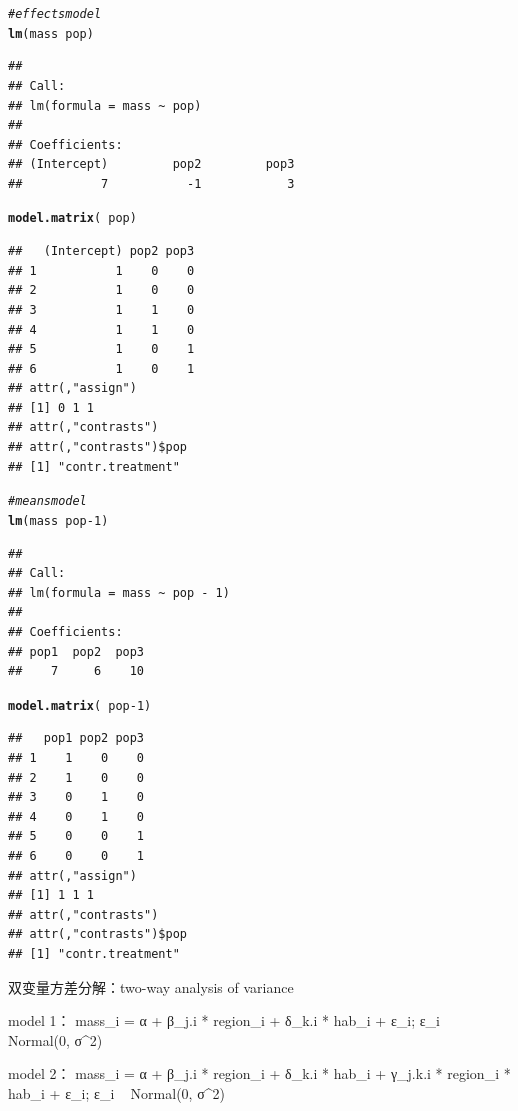 \documentclass{article}\usepackage[]{graphicx}\usepackage[]{color}
\makeatletter
\newcommand{\hlnum}[1]{\textcolor[rgb]{0.686,0.059,0.569}{#1}}%
\newcommand{\hlcom}[1]{\textcolor[rgb]{0.678,0.584,0.686}{\textit{#1}}}%
\newcommand{\hlopt}[1]{\textcolor[rgb]{0,0,0}{#1}}%
\newcommand{\hlstd}[1]{\textcolor[rgb]{0.345,0.345,0.345}{#1}}%
\newcommand{\hlkwd}[1]{\textcolor[rgb]{0.737,0.353,0.396}{\textbf{#1}}}%
\newenvironment{kframe}{%
 \def\at@end@of@kframe{}%
 \ifinner\ifhmode%
  \def\at@end@of@kframe{\end{minipage}}%
  \begin{minipage}{\columnwidth}%
 \fi\fi%
 \def\FrameCommand##1{\hskip\@totalleftmargin \hskip-\fboxsep
 \colorbox{shadecolor}{##1}\hskip-\fboxsep
     \hskip-\linewidth \hskip-\@totalleftmargin \hskip\columnwidth}%
 \MakeFramed {\advance\hsize-\width
   \@totalleftmargin\z@ \linewidth\hsize
   \@setminipage}}%
 {\par\unskip\endMakeFramed%
 \at@end@of@kframe}
\newenvironment{knitrout}{}{} %
\makeatother
\begin{document}
\begin{knitrout}
\color{fgcolor}\begin{kframe}
\begin{alltt}
\hlcom{# effects model}
\hlkwd{lm}\hlstd{(mass} \hlopt{~} \hlstd{pop)}
\end{alltt}
\begin{verbatim}
## 
## Call:
## lm(formula = mass ~ pop)
## 
## Coefficients:
## (Intercept)         pop2         pop3  
##           7           -1            3
\end{verbatim}
\begin{alltt}
\hlkwd{model.matrix}\hlstd{(}\hlopt{~}\hlstd{pop)}
\end{alltt}
\begin{verbatim}
##   (Intercept) pop2 pop3
## 1           1    0    0
## 2           1    0    0
## 3           1    1    0
## 4           1    1    0
## 5           1    0    1
## 6           1    0    1
## attr(,"assign")
## [1] 0 1 1
## attr(,"contrasts")
## attr(,"contrasts")$pop
## [1] "contr.treatment"
\end{verbatim}
\begin{alltt}
\hlcom{# means model}
\hlkwd{lm}\hlstd{(mass} \hlopt{~} \hlstd{pop} \hlopt{-} \hlnum{1}\hlstd{)}
\end{alltt}
\begin{verbatim}
## 
## Call:
## lm(formula = mass ~ pop - 1)
## 
## Coefficients:
## pop1  pop2  pop3  
##    7     6    10
\end{verbatim}
\begin{alltt}
\hlkwd{model.matrix}\hlstd{(}\hlopt{~}\hlstd{pop} \hlopt{-} \hlnum{1}\hlstd{)}
\end{alltt}
\begin{verbatim}
##   pop1 pop2 pop3
## 1    1    0    0
## 2    1    0    0
## 3    0    1    0
## 4    0    1    0
## 5    0    0    1
## 6    0    0    1
## attr(,"assign")
## [1] 1 1 1
## attr(,"contrasts")
## attr(,"contrasts")$pop
## [1] "contr.treatment"
\end{verbatim}
\end{kframe}
\end{knitrout}



双变量方差分解：two-way analysis of variance

model 1：
mass_i = α + β_j.i * region_i + δ_k.i * hab_i + ε_i;
      ε_i ~ Normal(0, σ^2)

model 2：
mass_i = α + β_j.i * region_i + δ_k.i * hab_i 
         + γ_j.k.i * region_i * hab_i + ε_i;
      ε_i ~ Normal(0, σ^2)
\end{document}

